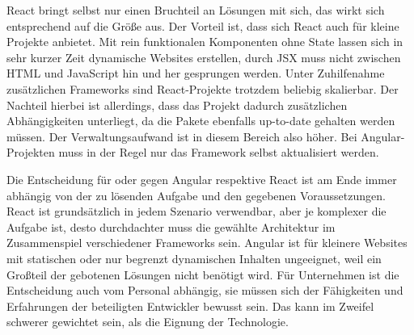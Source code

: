 React bringt selbst nur einen Bruchteil an Lösungen mit sich, das wirkt sich entsprechend auf die Größe aus. Der Vorteil ist, dass sich React auch für kleine Projekte anbietet. Mit rein funktionalen Komponenten ohne State lassen sich in sehr kurzer Zeit dynamische Websites erstellen, durch JSX muss nicht zwischen HTML und JavaScript hin und her gesprungen werden. Unter Zuhilfenahme zusätzlichen Frameworks sind React-Projekte trotzdem beliebig skalierbar. Der Nachteil hierbei ist allerdings, dass das Projekt dadurch zusätzlichen Abhängigkeiten unterliegt, da die Pakete ebenfalls up-to-date gehalten werden müssen. Der Verwaltungsaufwand ist in diesem Bereich also höher. Bei Angular-Projekten muss in der Regel nur das Framework selbst aktualisiert werden.

Die Entscheidung für oder gegen Angular respektive React ist am Ende immer abhängig von der zu lösenden Aufgabe und den gegebenen Voraussetzungen. React ist grundsätzlich in jedem Szenario verwendbar, aber je komplexer die Aufgabe ist, desto durchdachter muss die gewählte Architektur im Zusammenspiel verschiedener Frameworks sein. Angular ist für kleinere Websites mit statischen oder nur begrenzt dynamischen Inhalten ungeeignet, weil ein Großteil der gebotenen Lösungen nicht benötigt wird. Für Unternehmen ist die Entscheidung auch vom Personal abhängig, sie müssen sich der Fähigkeiten und Erfahrungen der beteiligten Entwickler bewusst sein. Das kann im Zweifel schwerer gewichtet sein, als die Eignung der Technologie.